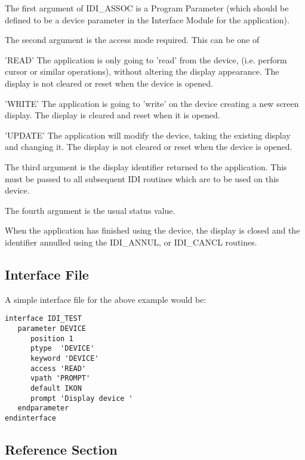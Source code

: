 The first argument of IDI\_ASSOC is a Program Parameter (which should be
defined to be a device parameter in the Interface Module for the
application).

The second argument is the access mode required. This can be one of

\hspace*{20mm}\begin{minipage}{140mm}

\noindent
'READ' The application is only going to 'read' from the device, (i.e.
perform cursor or similar operations), without altering the display
appearance. The display is not cleared or reset when the device is
opened.

'WRITE' The application is going to 'write' on the device creating
a new screen display. The display is cleared and reset when it
is opened.

'UPDATE' The application will modify the device, taking the existing
display and changing it. The display is not cleared or reset when the
device is opened.

\end{minipage}

The third argument is the display identifier returned to the application.
This must be passed to all subsequent IDI routines which are to be used
on this device.

The fourth argument is the usual status value.

When the application has finished using the device, the display is closed
and the identifier annulled using the IDI\_ANNUL, or IDI\_CANCL routines.

\subsection{Interface File}

A simple interface file for the above example would be:

\begin{small}
\begin{verbatim}
interface IDI_TEST
   parameter DEVICE
      position 1
      ptype  'DEVICE'
      keyword 'DEVICE'
      access 'READ'
      vpath 'PROMPT'
      default IKON
      prompt 'Display device '
   endparameter
endinterface
\end{verbatim}
\end{small}

\subsection{Reference Section}

